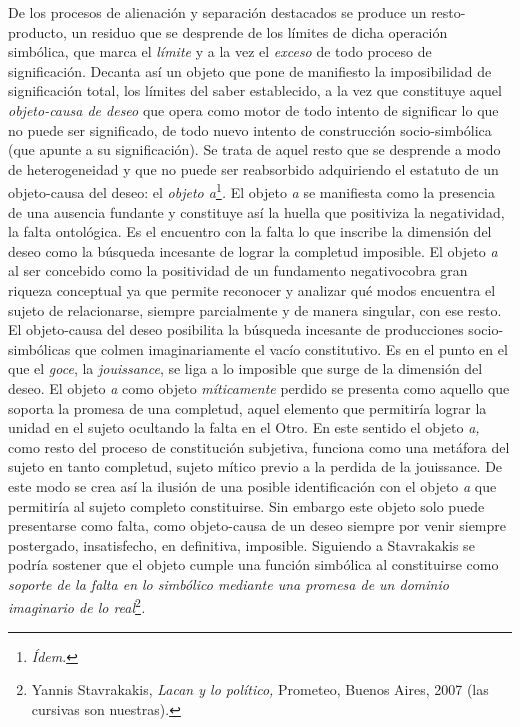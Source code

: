 De los procesos de alienación y separación destacados se produce un
resto-producto, un residuo que se desprende de los límites de dicha
operación simbólica, que marca el \emph{límite} y a la vez el
\emph{exceso} de todo proceso de significación. Decanta así un objeto
que pone de manifiesto la imposibilidad de significación total, los
límites del saber establecido, a la vez que constituye aquel
\emph{objeto-causa de deseo} que opera como motor de todo intento de
significar lo que no puede ser significado, de todo nuevo intento de
construcción socio-simbólica (que apunte a su significación). Se trata
de aquel resto que se desprende a modo de heterogeneidad y que no puede
ser reabsorbido adquiriendo el estatuto de un objeto-causa del deseo: el
\emph{objeto a}\footnote{\emph{Ídem}.}\emph{.} El objeto \emph{a} se
manifiesta como la presencia de una ausencia fundante y constituye así
la huella que positiviza la negatividad, la falta ontológica. Es el
encuentro con la falta lo que inscribe la dimensión del deseo como la
búsqueda incesante de lograr la completud imposible. El objeto \emph{a}
al ser concebido como la positividad de un fundamento negativocobra gran
riqueza conceptual ya que permite reconocer y analizar qué modos
encuentra el sujeto de relacionarse, siempre parcialmente y de manera
singular, con ese resto. El objeto-causa del deseo posibilita la
búsqueda incesante de producciones socio-simbólicas que colmen
imaginariamente el vacío constitutivo. Es en el punto en el que el
\emph{goce}, la \emph{jouissance}, se liga a lo imposible que surge de
la dimensión del deseo. El objeto \emph{a} como objeto
\emph{míticamente} perdido se presenta como aquello que soporta la
promesa de una completud, aquel elemento que permitiría lograr la unidad
en el sujeto ocultando la falta en el Otro. En este sentido el objeto
\emph{a,} como resto del proceso de constitución subjetiva, funciona
como una metáfora del sujeto en tanto completud, sujeto mítico previo a
la perdida de la jouissance. De este modo se crea así la ilusión de una
posible identificación con el objeto \emph{a} que permitiría al sujeto
completo constituirse. Sin embargo este objeto solo puede presentarse
como falta, como objeto-causa de un deseo siempre por venir siempre
postergado, insatisfecho, en definitiva, imposible. Siguiendo a
Stavrakakis se podría sostener que el objeto cumple una función
simbólica al constituirse como \emph{soporte de la falta en lo simbólico
mediante una promesa de un dominio imaginario de lo
real}\footnote{Yannis Stavrakakis, \emph{Lacan y lo político,} Prometeo,
  Buenos Aires, 2007 (las cursivas son nuestras).}\emph{.}

